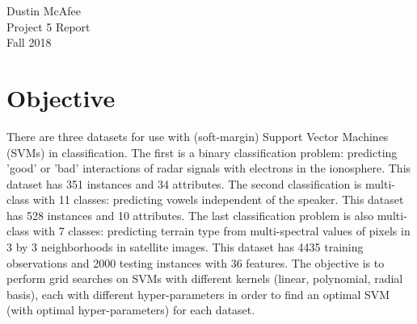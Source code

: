 \documentclass[tikz]{article}
\begin{document}
\begin{center}
Dustin McAfee \\
Project 5 Report \\
Fall 2018 \\
\end{center}

\singlespacing

\section{Objective}
\label{sec:obj}
There are three datasets for use with (soft-margin) Support Vector Machines (SVMs) in classification. The first is a binary classification problem: predicting 'good' or 'bad' interactions of radar signals with electrons in the ionosphere. This dataset has 351 instances and 34 attributes. The second classification is multi-class with 11 classes: predicting vowels independent of the speaker. This dataset has 528 instances and 10 attributes. The last classification problem is also multi-class with 7 classes: predicting terrain type from multi-spectral values of pixels in 3 by 3 neighborhoods in satellite images. This dataset has 4435 training observations and 2000 testing instances with 36 features. The objective is to perform grid searches on SVMs with different kernels (linear, polynomial, radial basis), each with different hyper-parameters in order to find an optimal SVM (with optimal hyper-parameters) for each dataset.
\end{document}
